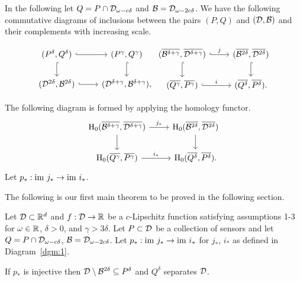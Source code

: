 In the following let $Q = P\cap {\mathcal{D}}_{\omega - c\delta}$ and ${\mathcal{B}} = {\mathcal{D}}_{\omega-2c\delta}$.
We have the following commutative diagrams of inclusions between the pairs $(P,Q)$ and $({\mathcal{D}}, {\mathcal{B}})$ and their complements with increasing scale.

\[ \begin{tikzcd}
(P^\delta, Q^\delta) \arrow[hookrightarrow]{r}\arrow[hookrightarrow]{d}& (P^\gamma, Q^\gamma) \arrow[hookrightarrow]{d} \\%
(\D^{2\delta}, \B^{2\delta}) \arrow[hookrightarrow]{r} & (\D^{\delta+\gamma}, \B^{\delta+\gamma}),
\end{tikzcd}
\begin{tikzcd}
(\overline{\B^{\delta+\gamma}}, \overline{\D^{\delta+\gamma}})\arrow[hookrightarrow]{r}{j}\arrow[hookrightarrow]{d}& (\overline{\B^{2\delta}}, \overline{\D^{2\delta}}) \arrow[hookrightarrow]{d} \\%
(\overline{Q^\gamma}, \overline{P^\gamma}) \arrow[hookrightarrow]{r}{i} & (\overline{Q^\delta}, \overline{P^\delta}).
\end{tikzcd}\]

The following diagram is formed by applying the homology functor.
\begin{equation}\label{dgm:1}
    \begin{tikzcd}
    \hom_0(\overline{\B^{\delta+\gamma}}, \overline{\D^{\delta+\gamma}})\arrow{r}{j_*}\arrow{d}& \hom_0(\overline{\B^{2\delta}}, \overline{\D^{2\delta}}) \arrow{d} \\%
    \hom_0(\overline{Q^\gamma}, \overline{P^\gamma}) \arrow{r}{i_*} & \hom_0(\overline{Q^\delta}, \overline{P^\delta}).
    \end{tikzcd}
\end{equation}
Let $p_* : \mathrm{im}~j_*\to\mathrm{im}~i_*$.

The following is our first main theorem to be proved in the following section.

\begin{theorem}\label{thm:tcc}
    Let ${\mathcal{D}}\subset\mathbb{R}^d$ and $f:{\mathcal{D}}\to\mathbb{R}$ be a $c$-Lipschitz function satisfying assumptions 1-3 for $\omega\in\mathbb{R}$, $\delta > 0$, and $\gamma > 3\delta$.
    Let $P\subset{\mathcal{D}}$ be a collection of sensors and let $Q = P\cap {\mathcal{D}}_{\omega - c\delta}$, ${\mathcal{B}} = {\mathcal{D}}_{\omega - 2c\delta}$.
    Let $p_* : \mathrm{im}~j_*\to\mathrm{im}~i_*$ for $j_*$, $i_*$ as defined in Diagram~\ref{dgm:1}.

    If $p_*$ is injective then ${\mathcal{D}}\setminus{\mathcal{B}}^{2\delta}\subseteq P^\delta$ and $Q^\delta$ separates ${\mathcal{D}}$.
\end{theorem}

